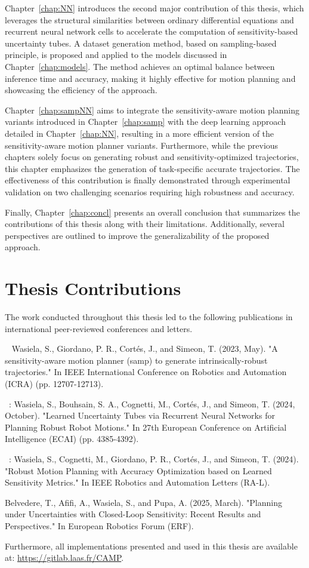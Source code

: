 Chapter~\ref{chap:NN} introduces the second major contribution of this thesis, which leverages the structural similarities between ordinary differential equations and recurrent neural network cells to accelerate the computation of sensitivity-based uncertainty tubes. 
A dataset generation method, based on sampling-based principle, is proposed and applied to the models discussed in Chapter~\ref{chap:models}. 
The method achieves an optimal balance between inference time and accuracy, making it highly effective for motion planning and showcasing the efficiency of the approach.

Chapter~\ref{chap:sampNN} aims to integrate the sensitivity-aware motion planning variants introduced in Chapter~\ref{chap:samp} with the deep learning approach detailed in Chapter~\ref{chap:NN}, resulting in a more efficient version of the sensitivity-aware motion planner variants.
Furthermore, while the previous chapters solely focus on generating robust and sensitivity-optimized trajectories, this chapter emphasizes the generation of task-specific accurate trajectories.
The effectiveness of this contribution is finally demonstrated through experimental validation on two challenging scenarios requiring high robustness and accuracy.

Finally, Chapter~\ref{chap:concl} presents an overall conclusion that summarizes the contributions of this thesis along with their limitations.
Additionally, several perspectives are outlined to improve the generalizability of the proposed approach.

\section{Thesis Contributions}

The work conducted throughout this thesis led to the following publications in international peer-reviewed conferences and letters. 

~\cite{cSAMP} Wasiela, S., Giordano, P. R., Cortés, J., and Simeon, T. (2023, May). "A sensitivity-aware motion planner (samp) to generate intrinsically-robust trajectories." In IEEE International Conference on Robotics and Automation (ICRA) (pp. 12707-12713).

~\cite{cECAI}: Wasiela, S., Bouhsain, S. A., Cognetti, M., Cortés, J., and Simeon, T. (2024, October). "Learned Uncertainty Tubes via Recurrent Neural Networks for Planning Robust Robot Motions." In 27th European Conference on Artificial Intelligence (ECAI) (pp. 4385-4392).

~\cite{cRAL}: Wasiela, S., Cognetti, M., Giordano, P. R., Cortés, J., and Simeon, T. (2024). "Robust Motion Planning with Accuracy Optimization based on Learned Sensitivity Metrics." In IEEE Robotics and Automation Letters (RA-L).

Belvedere, T., Afifi, A., Wasiela, S., and Pupa, A. (2025, March). "Planning under Uncertainties with Closed-Loop Sensitivity: Recent Results and Perspectives." In European Robotics Forum (ERF).

Furthermore, all implementations presented and used in this thesis are available at: \href{https://gitlab.laas.fr/CAMP}{https://gitlab.laas.fr/CAMP}.